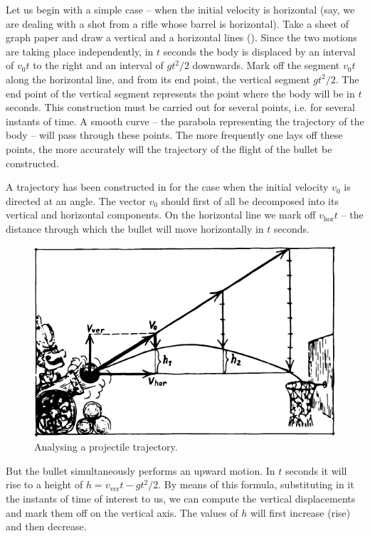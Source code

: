 Let us begin with a simple case -- when the initial
velocity is horizontal (say, we are dealing with a shot
from a rifle whose barrel is horizontal). Take a sheet of graph paper and draw a vertical and a horizontal lines (). Since the two motions are taking place independently, in $t$ seconds the body is displaced by an interval of $v_{0}t$ to the right and an interval
of $gt^{2} /2$ downwards. Mark off the segment $v_{0}t$ along the
horizontal line, and from its end point, the vertical segment $gt^{2} /2$. The end point of the vertical segment represents the point where the body will be in $t$ seconds. This construction must be carried out for several points, i.e. for several instants of time. A smooth curve -- the parabola representing the trajectory of the body -- will pass through these points. The more frequently one lays off these points, the more accurately will the trajectory of the flight of the bullet be constructed.

A trajectory has been constructed in  for the
case when the initial velocity $v_{0}$ is directed at an angle.
The vector $v_{0}$ should first of all be decomposed into its
vertical and horizontal components. On the horizontal
line we mark off $v_{\textrm{hor}} t$ -- the distance through which the
bullet will move horizontally in $t$ seconds.
\begin{figure}[!ht]
\centering
\includegraphics[width=\textwidth]{figures/fig-02-04.pdf}
\caption{Analysing a projectile trajectory.}
\label{fig-2.04}
\end{figure}
But the bullet simultaneously performs an upward
motion. In $t$ seconds it will rise to a height of $h =
 v_{\textrm{ver}} t - gt^{2} /2$. By means of this formula, substituting
in it the instants of time of interest to us, we can compute
the vertical displacements and mark them off on the
vertical axis. The values of $h$ will first increase (rise)
and then decrease.

